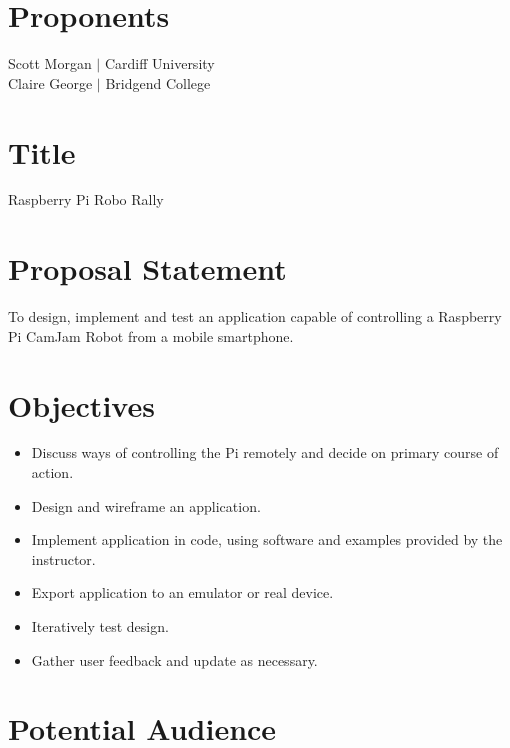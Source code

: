 \documentclass[10pt]{article}
\begin{document}
	
	\newpage																		
	
	\newpage
	
	\section{Proponents}
	
	Scott Morgan \hspace{3mm} $\vert$ \hspace{3mm} Cardiff University \\
	Claire George \hspace{3mm} $\vert$ \hspace{3mm} Bridgend College
	
	\section{Title} 
	
	Raspberry Pi Robo Rally 
	
	\section{Proposal Statement}
	
	To design, implement and test an application capable of controlling a Raspberry Pi CamJam Robot from a mobile smartphone.
	
	\section{Objectives}

	\begin{itemize}
		\item Discuss ways of controlling the Pi remotely and decide on primary course of action.  
		\item Design and wireframe an application.
		\item Implement application in code, using software and examples provided by the instructor.
		\item Export application to an emulator or real device.
		\item Iteratively test design.
		\item Gather user feedback and update as necessary.
	\end{itemize}
	
	\section{Potential Audience}
	
\end{document}
